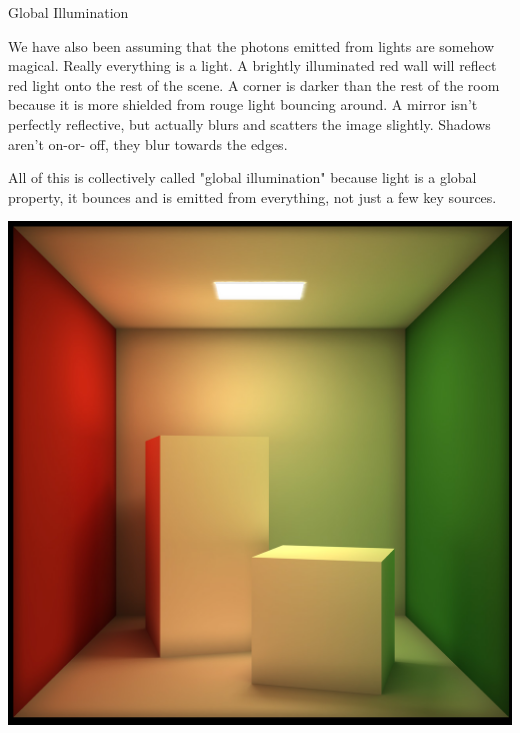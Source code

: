 \documentclass{lug}
\newcommand{\splitslide}[4]{
    \noindent
    \begin{minipage}{#1 \textwidth - #2 }
        #3
    \end{minipage}%
    \hspace{ \dimexpr #2 * 2 \relax }%
    \begin{minipage}{\textwidth - #1 \textwidth - #2 }
        #4
    \end{minipage}
}
\begin{document}
\begin{frame}{Global Illumination}
    \splitslide{0.65}{.7em}{
        \small

        We have also been assuming that the photons emitted from lights are
        somehow magical. Really everything is a light. A brightly illuminated
        red wall will reflect red light onto the rest of the scene. A corner
        is darker than the rest of the room because it is more shielded from
        rouge light bouncing around. A mirror isn't perfectly reflective, but
        actually blurs and scatters the image slightly. Shadows aren't on-or-%
        off, they blur towards the edges.

        \vspace{1ex}

        All of this is collectively called "global illumination" because light
        is a global property, it bounces and is emitted from everything, not
        just a few key sources.

    }{
        \includegraphics[width=\textwidth]{graphics/cornell_box}
    }
\end{frame}
\end{document}
